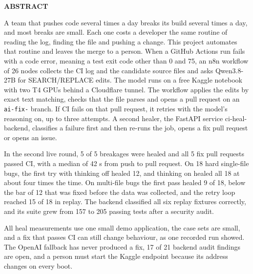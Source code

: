 \begin{center}
{\Large\textbf{ABSTRACT}}
\end{center}
\vspace{1em}

A team that pushes code several times a day breaks its build several times a day, and most breaks are small. Each one costs a developer the same routine of reading the log, finding the file and pushing a change. This project automates that routine and leaves the merge to a person. When a GitHub Actions run fails with a code error, meaning a test exit code other than 0 and 75, an n8n workflow of 26 nodes collects the CI log and the candidate source files and asks Qwen3.8-27B for SEARCH/REPLACE edits. The model runs on a free Kaggle notebook with two T4 GPUs behind a Cloudflare tunnel. The workflow applies the edits by exact text matching, checks that the file parses and opens a pull request on an \texttt{ai-fix-} branch. If CI fails on that pull request, it retries with the model's reasoning on, up to three attempts. A second healer, the FastAPI service ci-heal-backend, classifies a failure first and then re-runs the job, opens a fix pull request or opens an issue.

In the second live round, 5 of 5 breakages were healed and all 5 fix pull requests passed CI, with a median of 42 s from push to pull request. On 18 hard single-file bugs, the first try with thinking off healed 12, and thinking on healed all 18 at about four times the time. On multi-file bugs the first pass healed 9 of 18, below the bar of 12 that was fixed before the data was collected, and the retry loop reached 15 of 18 in replay. The backend classified all six replay fixtures correctly, and its suite grew from 157 to 205 passing tests after a security audit.

All heal measurements use one small demo application, the case sets are small, and a fix that passes CI can still change behaviour, as one recorded run showed. The OpenAI fallback has never produced a fix, 17 of 21 backend audit findings are open, and a person must start the Kaggle endpoint because its address changes on every boot.

\clearpage
